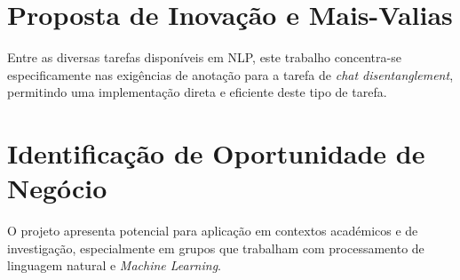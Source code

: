\section{Proposta de Inovação e Mais-Valias}
Entre as diversas tarefas disponíveis em NLP, este trabalho concentra-se especificamente nas exigências de anotação para a tarefa de \textit{chat disentanglement}, permitindo uma implementação direta e eficiente deste tipo de tarefa.

\section{Identificação de Oportunidade de Negócio}
O projeto apresenta potencial para aplicação em contextos académicos e de investigação, especialmente em grupos que trabalham com processamento de linguagem natural e \textit{Machine Learning}.

